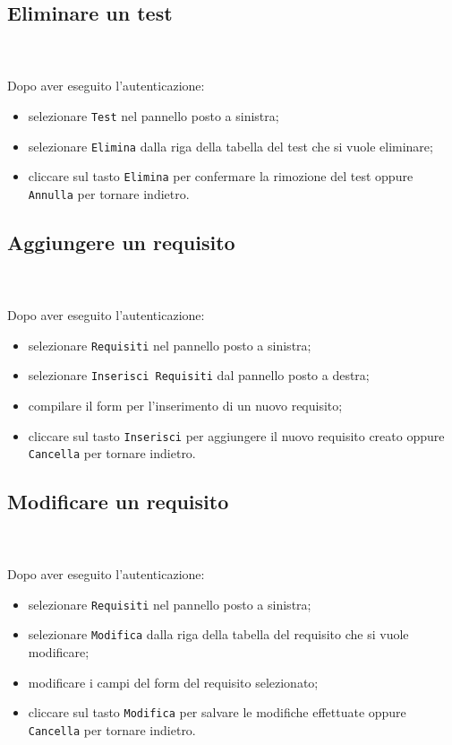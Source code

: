 	\subsection{Eliminare un test} \mbox{}\\ \mbox{}\\
	Dopo aver eseguito l'autenticazione:
	\begin{itemize}
		\item selezionare \texttt{Test} nel pannello posto a sinistra;
		\item selezionare \texttt{Elimina} dalla riga della tabella del test
		che si vuole eliminare;\
		\item cliccare sul tasto \texttt{Elimina} per confermare la rimozione 
		del test
		oppure \texttt{Annulla} per tornare indietro.
	\end{itemize}		
	
	\subsection{Aggiungere un requisito} \mbox{}\\ \mbox{}\\
	Dopo aver eseguito l'autenticazione:
	\begin{itemize}
		\item selezionare \texttt{Requisiti} nel pannello posto a sinistra;
		\item selezionare \texttt{Inserisci Requisiti} dal pannello posto a 
		destra;
		\item compilare il form per l'inserimento di un nuovo requisito;
		\item cliccare sul tasto \texttt{Inserisci} per aggiungere il nuovo 
		requisito
		creato oppure \texttt{Cancella} per tornare indietro.	
	\end{itemize}
	
	\subsection{Modificare un requisito} \mbox{}\\ \mbox{}\\
	Dopo aver eseguito l'autenticazione:
	\begin{itemize}
		\item selezionare \texttt{Requisiti} nel pannello posto a sinistra;
		\item selezionare \texttt{Modifica} dalla riga della tabella del 
		requisito
		che si vuole modificare;
		\item modificare i campi del form del requisito selezionato;
		\item cliccare sul tasto \texttt{Modifica} per salvare le modifiche 
		effettuate
		oppure \texttt{Cancella} per tornare indietro.
	\end{itemize}
	
